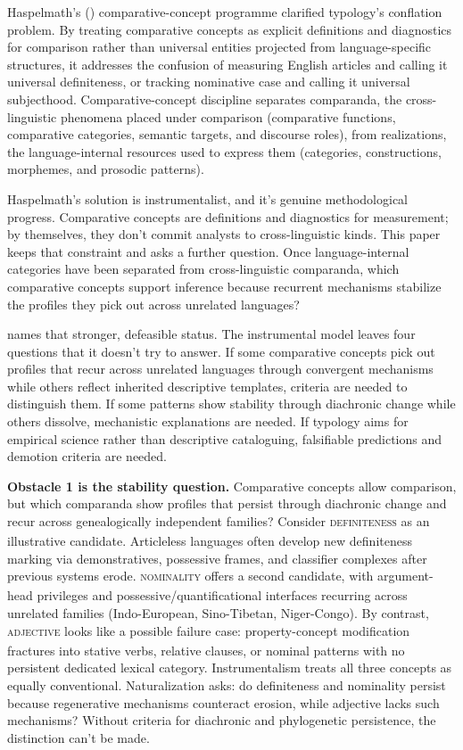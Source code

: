 \documentclass[12pt]{article}
\begin{document}
Haspelmath's (\citeyear{haspelmath2010}) comparative-concept programme clarified typology's conflation problem. By treating comparative concepts as explicit definitions and diagnostics for comparison rather than universal entities projected from language-specific structures, it addresses the confusion of measuring English articles and calling it universal definiteness, or tracking nominative case and calling it universal subjecthood. Comparative-concept discipline separates comparanda, the cross-linguistic phenomena placed under comparison (comparative functions, comparative categories, semantic targets, and discourse roles), from realizations, the language-internal resources used to express them (categories, constructions, morphemes, and prosodic patterns).

Haspelmath's solution is instrumentalist, and it's genuine methodological progress. Comparative concepts are definitions and diagnostics for measurement; by themselves, they don't commit analysts to cross-linguistic kinds. This paper keeps that constraint and asks a further question. Once language-internal categories have been separated from cross-linguistic comparanda, which comparative concepts support inference because recurrent mechanisms stabilize the profiles they pick out across unrelated languages?

 names that stronger, defeasible status. The instrumental model leaves four questions that it doesn't try to answer. If some comparative concepts pick out profiles that recur across unrelated languages through convergent mechanisms while others reflect inherited descriptive templates, criteria are needed to distinguish them. If some patterns show stability through diachronic change while others dissolve, mechanistic explanations are needed. If typology aims for empirical science rather than descriptive cataloguing, falsifiable predictions and demotion criteria are needed.

\textbf{Obstacle 1 is the stability question.} Comparative concepts allow comparison, but which comparanda show profiles that persist through diachronic change and recur across genealogically independent families? Consider \textsc{definiteness}\textsubscript{\Cross} as an illustrative candidate. Articleless languages often develop new definiteness marking via demonstratives, possessive frames, and classifier complexes after previous systems erode. \textsc{nominality}\textsubscript{\Cross} offers a second candidate, with argument-head privileges and possessive/quantificational interfaces recurring across unrelated families (Indo-European, Sino-Tibetan, Niger-Congo). By contrast, \textsc{adjective}\textsubscript{\Cross} looks like a possible failure case: property-concept modification fractures into stative verbs, relative clauses, or nominal patterns with no persistent dedicated lexical category. Instrumentalism treats all three concepts as equally conventional. Naturalization asks: do definiteness and nominality persist because regenerative mechanisms counteract erosion, while adjective lacks such mechanisms? Without criteria for diachronic and phylogenetic persistence, the distinction can't be made.
\end{document}
